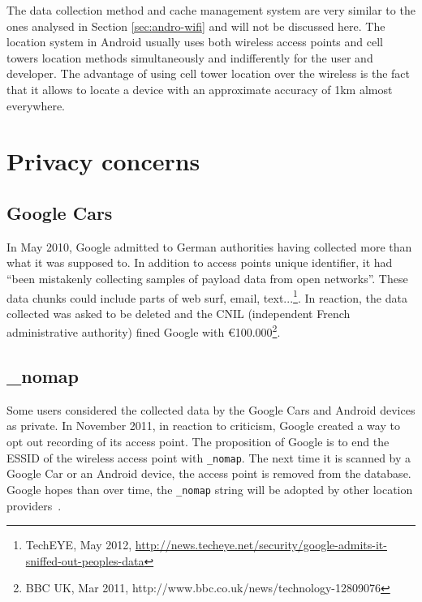 The data collection method and cache management system are very similar to the ones analysed in Section \ref{sec:andro-wifi} and will not be discussed here.
The location system in Android usually uses both wireless access points and cell towers location methods simultaneously and indifferently for the user and developer.
The advantage of using cell tower location over the wireless is the fact that it allows to locate a device with an approximate accuracy of 1km almost everywhere.


\section{Privacy concerns}
\label{sec:andro-priv}

\subsection{Google Cars}
In May 2010, Google admitted to German authorities having collected more than what it was supposed to.
In addition to access points unique identifier, it had ``been mistakenly collecting samples of payload data from open networks''.
These data chunks could include parts of web surf, email, text...\footnote{TechEYE, May 2012, \url{http://news.techeye.net/security/google-admits-it-sniffed-out-peoples-data}}.
In reaction, the data collected was asked to be deleted and the CNIL (independent French administrative authority) fined Google with €100.000\footnote{BBC UK, Mar 2011, http://www.bbc.co.uk/news/technology-12809076}.\\

\subsection{\_nomap}

Some users considered the collected data by the Google Cars and Android devices as private.
In November 2011, in reaction to criticism, Google created a way to opt out recording of its access point.
The proposition of Google is to end the ESSID of the wireless access point with \texttt{\_nomap}.
The next time it is scanned by a Google Car or an Android device, the access point is removed from the database.
Google hopes than over time, the \texttt{\_nomap} string will be adopted by other location providers~\cite{nomap}.\\

